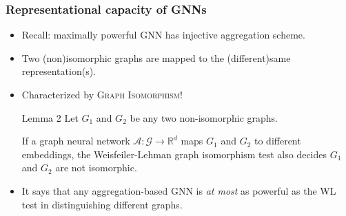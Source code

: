 \documentclass{beamer}
\begin{document}
\begin{frame}
\frametitle{Representational capacity of GNNs}

\begin{itemize}
	\item Recall: maximally powerful GNN has injective aggregation scheme. \pause
	
	\item Two (non)isomorphic graphs are mapped to the (different)same representation(s). \pause
	
	\item Characterized by \textsc{Graph Isomorphism}! \pause
	
	\begin{block}{Lemma 2}
Let $G_1$ and $G_2$ be any two non-isomorphic graphs.

If a graph neural network $\mathcal{A} : \mathcal{G} \rightarrow \mathbb{R}^d$ maps $G_1$ and $G_2$ to different embeddings, the Weisfeiler-Lehman graph isomorphism test also decides $G_1$ and $G_2$ are not isomorphic.
	\end{block} \pause

	\item It says that \alert{any aggregation-based GNN is {\it at most} as powerful as the WL test} in distinguishing different graphs.
\end{itemize}

\end{frame}
\end{document}
